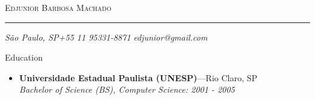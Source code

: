 \documentclass[11pt,oneside]{article}
\makeatletter
\newcommand{\name}{Edjunior Barbosa Machado}
\newcommand{\addr}{São Paulo, SP}
\newcommand{\phone}{+55 11 95331-8871}
\newcommand{\email}{edjunior@gmail.com}
\newcommand{\bigname}[1]{
	\begin{center}\selectfont\Huge\scshape#1\end{center}
}
\newenvironment{ressection}[1]{
	\vspace{4pt}
	{\selectfont\Large#1}
	\begin{itemize}
	\vspace{3pt}
}{
	\end{itemize}
}
\newcommand{\resbigitem}[3]{
	\vspace{-5pt}
	\item
	\textbf{#1}---#2 \\
	\textit{#3}
}
\makeatother
\begin{document}
\bigname{\name}

\vspace{-8pt} \rule{\textwidth}{1pt}

\vspace{-1pt} {\small\itshape \addr \hfill \phone}
\vspace{-1pt} {\small\itshape \email}

\vspace{8 pt}




\begin{ressection}{Education}

  \resbigitem{Universidade Estadual Paulista (UNESP)}{Rio Claro, SP}{Bachelor of Science (BS), Computer Science: 2001 - 2005}
	\vspace{-2pt}

\end{ressection}
\end{document}
